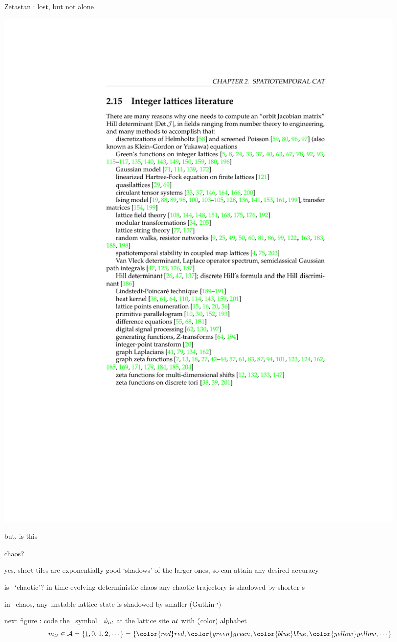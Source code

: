\begin{frame}{Zetastan : lost, but not alone}
\begin{center}
\hfill\includegraphics[width=0.90\textwidth]{lattLitClip2}
\end{center}
\end{frame}

\begin{frame}{but, is this}
\vfill
\begin{center}
{\huge chaos?}
\end{center}
\vfill
yes, short tiles are exponentially good `shadows' of the larger ones,
so can attain any desired accuracy
\end{frame}

\begin{frame}{is \catlatt\ `chaotic'?}
in time-evolving deterministic chaos any chaotic trajectory is
{\color{blue}shadowed by shorter \po s}
\bigskip

in \spt\ chaos, any unstable lattice state is {\color{blue}shadowed by
smaller \twots}
(Gutkin \etal{}${}^{,}${})

\vfill

next figure : code the \Mm\ symbol \brick\  $\phi_{nt}$ at the
lattice site $nt$ with (color) alphabet
\[
\Ssym{t\ell} \in \A=\{\underline{1},0,1,2,\cdots\}=
\{%
{\color{red}red},
{\color{green}green},
{\color{blue}blue},
{\color{yellow}yellow},\cdots%
\}
\]

\end{frame}

